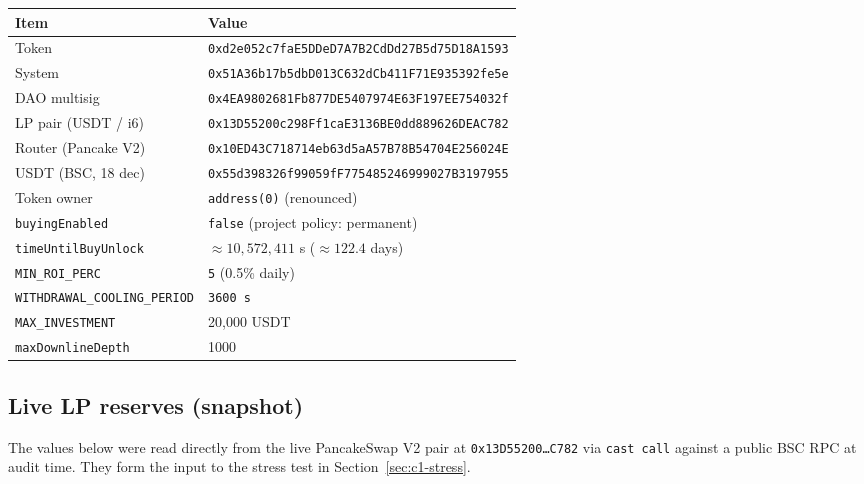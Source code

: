 \documentclass[11pt,a4paper]{article}
\begin{document}
\begin{center}
\renewcommand{\arraystretch}{1.3}
\begin{tabular}{p{4.8cm} p{8.2cm}}
\toprule
\textbf{Item} & \textbf{Value} \\
\midrule
Token                 & \texttt{0xd2e052c7faE5DDeD7A7B2CdDd27B5d75D18A1593} \\
System                & \texttt{0x51A36b17b5dbD013C632dCb411F71E935392fe5e} \\
DAO multisig          & \texttt{0x4EA9802681Fb877DE5407974E63F197EE754032f} \\
LP pair (USDT / i6)   & \texttt{0x13D55200c298Ff1caE3136BE0dd889626DEAC782} \\
Router (Pancake V2)   & \texttt{0x10ED43C718714eb63d5aA57B78B54704E256024E} \\
USDT (BSC, 18 dec)    & \texttt{0x55d398326f99059fF775485246999027B3197955} \\
Token owner           & \texttt{address(0)} (renounced) \\
\texttt{buyingEnabled}                 & \texttt{false} (project policy: permanent) \\
\texttt{timeUntilBuyUnlock}            & $\approx 10{,}572{,}411$ s ($\approx 122.4$ days) \\
\texttt{MIN\_ROI\_PERC}                & \texttt{5} (0.5\% daily) \\
\texttt{WITHDRAWAL\_COOLING\_PERIOD}   & \texttt{3600 s} \\
\texttt{MAX\_INVESTMENT}               & 20{,}000 USDT \\
\texttt{maxDownlineDepth}              & 1000 \\
\bottomrule
\end{tabular}
\end{center}

\subsection{Live LP reserves (snapshot)}
\label{sec:live-lp}

The values below were read directly from the live PancakeSwap V2 pair at
\texttt{0x13D55200\dots C782} via \texttt{cast call} against a public BSC
RPC at audit time. They form the input to the stress test in
Section~\ref{sec:c1-stress}.
\end{document}
